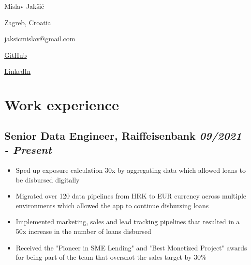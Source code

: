 \documentclass[a4paper]{article}
\newcommand{\bolditalicpair}
[2]
{\textbf{#1} \texorpdfstring{\hfill}{} \textit{#2}}
\begin{document}
\pagecolor{BackgroundColor}

\begin{multicols}{3}

\noindent
\begin{minipage}{.22\textwidth}
\raggedright

{\huge Mislav Jakšić}

Zagreb, Croatia
\end{minipage}

\noindent
\begin{minipage}{.50\textwidth}
\raggedleft

\end{minipage}

\noindent
\begin{minipage}{.32\textwidth}
\raggedleft

\href{mailto:jaksicmislav@gmail.com}{jaksicmislav@gmail.com}

\href{https://github.com/MislavJaksic}{GitHub}

\href{https://www.linkedin.com/in/mislav-jaksic}{LinkedIn}

\end{minipage}

\end{multicols}



\section{Work experience}

\subsection{\bolditalicpair{Senior Data Engineer, Raiffeisenbank}{09/2021 - Present}}

\begin{itemize}
 \item Sped up exposure calculation 30x by aggregating data which allowed loans to be disbursed digitally
 \item Migrated over 120 data pipelines from HRK to EUR currency across multiple environments which allowed the app to continue disbursing loans
 \item Implemented marketing, sales and lead tracking pipelines that resulted in a 50x increase in the number of loans disbursed
 \item Received the "Pioneer in SME Lending" and "Best Monetized Project" awards for being part of the team that overshot the sales target by 30\%
\end{itemize}
\end{document}
